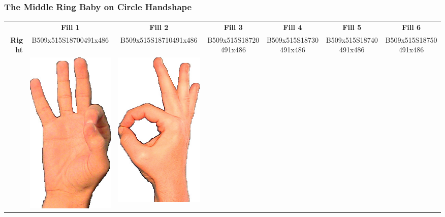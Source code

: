 \documentclass{article}
\begin{document}
\subsubsection{The Middle Ring Baby on Circle Handshape}

\begin{center}
\begin{tabular}{r*{6}{c}}
&\textbf{Fill 1}&\textbf{Fill 2}&\textbf{Fill 3}&\textbf{Fill 4}&\textbf{Fill 5}&\textbf{Fill 6}\\
\multirow{2}{*}{\textbf{Right}}&
B509x515S18700491x486&
B509x515S18710491x486&
B509x515S18720491x486&
B509x515S18730491x486&
B509x515S18740491x486&
B509x515S18750491x486\\
&
\includegraphics[scale=0.1]{images/09-01-1.jpg}&
\includegraphics[scale=0.1]{images/09-01-2.jpg}&

\end{tabular}
\end{center}
\end{document}
